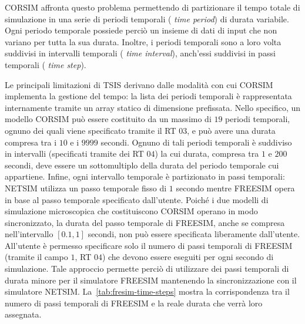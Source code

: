 \acs{CORSIM} affronta questo problema permettendo di partizionare il tempo totale di simulazione in una serie di periodi temporali (\ie{} \emph{time period}) di durata variabile. Ogni periodo temporale possiede perciò un insieme di dati di input che non variano per tutta la sua durata. Inoltre, i periodi temporali sono a loro volta suddivisi in intervalli temporali (\ie{} \emph{time interval}), anch'essi suddivisi in passi temporali (\ie{} \emph{time step}).

Le principali limitazioni di \acs{TSIS} derivano dalle modalità con cui \acs{CORSIM} implementa la gestione del tempo: la lista dei periodi temporali è rappresentata internamente tramite un array statico di dimensione prefissata. Nello specifico, un modello \acs{CORSIM} può essere costituito da un massimo di $19$ periodi temporali, ognuno dei quali viene specificato tramite il \acs{RT} $03$, e può avere una durata compresa tra i $10$ e i $9999$ secondi. Ognuno di tali periodi temporali è suddiviso in intervalli (specificati tramite dei \acs{RT} $04$) la cui durata, compresa tra $1$ e $200$ secondi, deve essere un sottomultiplo della durata del periodo temporale cui appartiene. Infine, ogni intervallo temporale è partizionato in passi temporali: \acs{NETSIM} utilizza un passo temporale fisso di $1$ secondo mentre \acs{FREESIM} opera in base al passo temporale specificato dall'utente. Poiché i due modelli di simulazione microscopica che costituiscono \acs{CORSIM} operano in modo sincronizzato, la durata del passo temporale di \acs{FREESIM}, anche se compresa nell'intervallo $[0.1,1]$ secondi, non può essere specificata liberamente dall'utente. All'utente è permesso specificare solo il numero di passi temporali di \acs{FREESIM} (tramite il campo $1$, \acs{RT} $04$) che devono essere eseguiti per ogni secondo di simulazione. Tale approccio permette perciò di utilizzare dei passi temporali di durata minore per il simulatore \acs{FREESIM} mantenendo la sincronizzazione con il simulatore \acs{NETSIM}. La~\vref{tab:fresim-time-steps} mostra la corrispondenza tra il numero di passi temporali di \acs{FREESIM} e la reale durata che verrà loro assegnata.

